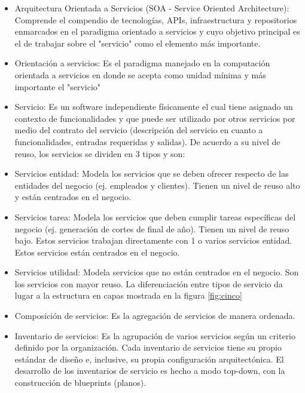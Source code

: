 \begin{itemize}
  \item Arquitectura Orientada a Servicios (SOA - Service Oriented Architecture): Comprende el compendio de tecnologías, APIs, infraestructura y repositorios enmarcados en
el paradigma orientado a servicios y cuyo objetivo principal es el de trabajar sobre el "servicio" como el elemento más importante.

  \item Orientación a servicios: Es el paradigma manejado en la computación orientada a servicios en donde se acepta como unidad mínima y más importante el "servicio"

  \item Servicio: Es un software independiente físicamente el cual tiene asignado un contexto de funcionalidades y que puede ser utilizado por otros servicios por medio
del contrato del servicio (descripción del servicio en cuanto a funcionalidades, entradas requeridas y salidas). De acuerdo a su nivel de reuso, los servicios se dividen en 3 tipos y son:
  \item Servicios entidad: Modela los servicios que se deben ofrecer respecto de las entidades del negocio (ej. empleados y clientes). Tienen un nivel de reuso alto y están centrados en el negocio.
  \item Servicios tarea: Modela los servicios que deben cumplir tareas específicas del negocio (ej. generación de cortes de final de año). Tienen un nivel de reuso bajo. Estos servicios trabajan directamente con 1 o varios servicios entidad. Estos servicios están centrados en el negocio.
  \item Servicios utilidad: Modela servicios que no están centrados en el negocio. Son los servicios con mayor reuso.
La diferenciación entre tipos de servicio da lugar a la estructura en capas mostrada en la figura \ref{fig:cinco}

  \item Composición de servicios: Es la agregación de servicios de manera ordenada.

  \item Inventario de servicios: Es la agrupación de varios servicios según un criterio definido por la organización. Cada inventario de servicios tiene su propio estándar
de diseño e, inclusive, su propia configuración arquitectónica. El desarrollo de los inventarios de servicio es hecho a modo top-down, con la construcción de blueprints (planos).
\end{itemize}

